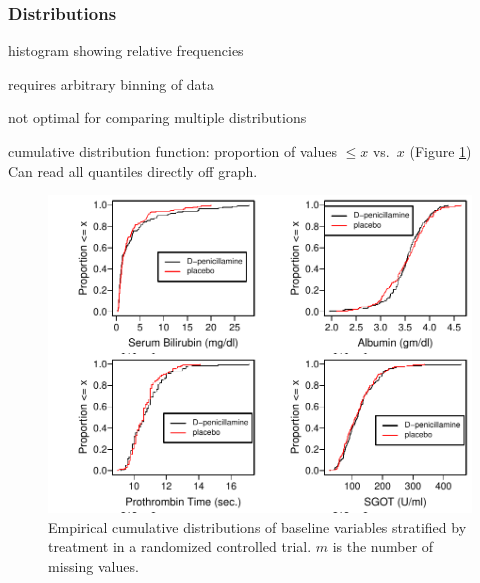 \subsubsection{Distributions}
\bi
\item histogram showing relative frequencies
 \bi
 \item requires arbitrary binning of data
 \item not optimal for comparing multiple distributions
 \ei
\item cumulative distribution function: proportion of values $\leq x$
  vs.\ $x$ (Figure \ref{fig:descript-ecdf}) \\
 Can read all quantiles directly off graph.
\begin{Schunk}
\begin{figure}[htbp]

\centerline{\includegraphics[width=\maxwidth]{descript-ecdf-1} }

\caption[Empirical cumulative distribution functions]{Empirical cumulative distributions of baseline variables  stratified by treatment in a randomized controlled trial. $m$ is the number of missing values.}\label{fig:descript-ecdf}
\end{figure}
\end{Schunk}


